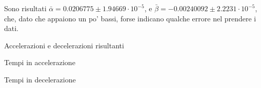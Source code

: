 Sono risultati $\bar{\alpha} = 0.0206775 \pm 1.94669 \cdot 10^{-5}$, e
$\bar{\beta} = -0.00240092 \pm 2.2231 \cdot 10^{-5}$, che, dato che appaiono un
po' bassi, forse indicano qualche errore nel prendere i dati.

\begin{tabella}
    \centering

\caption{Accelerazioni e decelerazioni risultanti}
\label{tab:dec}
\end{tabella}

\begin{tabella}
    \centering

\caption{Tempi in accelerazione}
\label{tab:acc}
\end{tabella}

\begin{tabella}
    \centering

\caption{Tempi in decelerazione}
\label{tab:dec}
\end{tabella}

